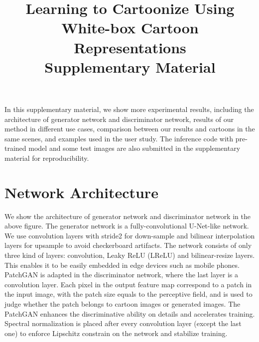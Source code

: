 \documentclass[10pt,twocolumn,letterpaper]{article}
\begin{document}



\title{Learning to Cartoonize Using White-box Cartoon Representations\\Supplementary Material}



In this supplementary material, we show more experimental results, including the architecture of generator network and discriminator network, results of our method in different use cases, comparison between our results and cartoons in the same scenes, and examples used in the user study. The inference code with pre-trained model and some test images are also submitted in the supplementary material for reproducibility.

\section{Network Architecture}
We show the architecture of generator network and discriminator network in the above figure. The generator network is a fully-convolutional U-Net-like \cite{ronneberger2015u} network. We use convolution layers with stride2 for down-sample and bilinear interpolation layers for upsample to avoid checkerboard artifacts. The network consists of only three kind of layers: convolution,  Leaky ReLU (LReLU) \cite{maas2013rectifier} and bilinear-resize layers. This enables it to be easily embedded in edge devices such as mobile phones. PatchGAN \cite{isola2017image} is adapted in the discriminator network, where the last layer is a convolution layer. Each pixel in the output feature map correspond to a patch in the input image, with the patch size equals to the perceptive field, and is used to judge whether the patch belongs to cartoon images or generated images. The PatchGAN enhances the discriminative ability on details and accelerates training. Spectral normalization \cite{miyato2018spectral} is placed after every convolution layer (except the last one) to enforce Lipschitz constrain on the network and stabilize training.
\end{document}
